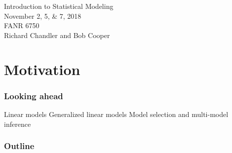 \documentclass[color=usenames,dvipsnames]{beamer}\usepackage[]{graphicx}\usepackage[]{color}
\begin{document}



\begin{frame}[plain]
  \huge
  \centering \par
  \textcolor{NavyBlue}{Introduction to Statistical Modeling} \\
  \vspace{1cm}
  \Large
  November 2, 5, \& 7, 2018 \\
  FANR 6750 \\
  \vfill
  \large
  Richard Chandler and Bob Cooper
\end{frame}


\section{Motivation}



\begin{frame}
  \frametitle{Looking ahead}
  \Large
  Linear models
  \vfill
  Generalized linear models
  \vfill
  Model selection and multi-model inference
\end{frame}






\begin{frame}
  \frametitle{Outline}
  \LARGE
\end{frame}
\end{document}

